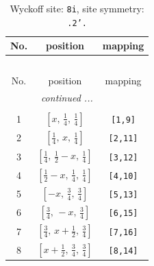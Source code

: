 \documentclass[fleqn,8pt]{jsarticle}
\begin{document}
\begin{longtable}{ccc}
\caption{Wyckoff site: {\tt 8i}, site symmetry: {\tt .2'.}}
 \\
 \hline \hline
No. & position & mapping \\ \hline \endfirsthead

\multicolumn{2}{l}{\tablename\ \thetable{}} \\
 \hline \hline
No. & position & mapping \\ \hline \endhead

 \hline \hline
\multicolumn{2}{r}{\footnotesize\it continued ...} \\ \endfoot

 \hline \hline
\multicolumn{2}{r}{} \\ \endlastfoot

1 & $\left[ x,\, \frac{1}{4},\, \frac{1}{4} \right]$ & {\tt [1,9]} \\ \hline
2 & $\left[ \frac{1}{4},\, x,\, \frac{1}{4} \right]$ & {\tt [2,11]} \\ \hline
3 & $\left[ \frac{1}{4},\, \frac{1}{2} - x,\, \frac{1}{4} \right]$ & {\tt [3,12]} \\ \hline
4 & $\left[ \frac{1}{2} - x,\, \frac{1}{4},\, \frac{1}{4} \right]$ & {\tt [4,10]} \\ \hline
5 & $\left[ - x,\, \frac{3}{4},\, \frac{3}{4} \right]$ & {\tt [5,13]} \\ \hline
6 & $\left[ \frac{3}{4},\, - x,\, \frac{3}{4} \right]$ & {\tt [6,15]} \\ \hline
7 & $\left[ \frac{3}{4},\, x + \frac{1}{2},\, \frac{3}{4} \right]$ & {\tt [7,16]} \\ \hline
8 & $\left[ x + \frac{1}{2},\, \frac{3}{4},\, \frac{3}{4} \right]$ & {\tt [8,14]} \\
\end{longtable}
\renewcommand{\arraystretch}{1.2}
\end{document}

